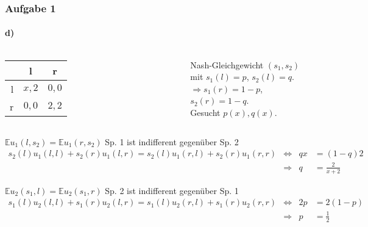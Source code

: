 \documentclass{beamer}
\newcommand{\E}{\mathbb{E}}
\begin{document}
\begin{frame}
\frametitle{Aufgabe 1}
\framesubtitle{d)}

\begin{columns}[c]
\begin{tabular}{r|c|c|}
    & l & r \\
    \hline
l & $x, 2$ & $0, 0$ \\
r & $0, 0$ & $2, 2$ \\
    \hline
\end{tabular}

Nash-Gleichgewicht $(s_1, s_2)$ mit $s_1(l) = p$, $s_2(l) = q$.\\
$\Rightarrow s_1(r) = 1 - p$, $s_2(r) = 1 - q$. \\
Gesucht $p(x), q(x)$.
\end{columns}

\begin{block}{$\E u_1(l, s_2) = \E u_1(r, s_2)$ \hfill Sp. 1 ist indifferent gegenüber Sp. 2}
\begin{align*}
s_2(l)u_1(l,l) + s_2(r)u_1(l,r) = s_2(l)u_1(r,l) + s_2(r)u_1(r,r)
& \Leftrightarrow & 
qx & = (1-q)2 \\
& \Rightarrow &
q & = \frac{2}{x+2}
\end{align*}
\end{block}

\begin{block}{$\E u_2(s_1, l) = \E u_2(s_1, r)$ \hfill Sp. 2 ist indifferent gegenüber Sp. 1}
\begin{align*}
s_1(l)u_2(l,l) + s_1(r)u_2(l,r) = s_1(l)u_2(r,l) + s_1(r)u_2(r,r)
& \Leftrightarrow &
2p& = 2(1-p) \\
& \Rightarrow &
p & = \frac{1}{2}
\end{align*}
\end{block}

\end{frame}
\end{document}
